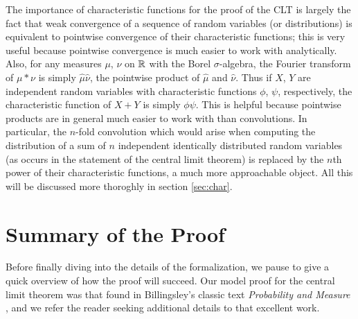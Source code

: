 \documentclass[leqno]{article}
\theoremstyle{definition}
\begin{document}
The importance of characteristic functions for the proof of the CLT is largely the fact that weak convergence of a sequence of random variables (or distributions) is equivalent to pointwise convergence of their characteristic functions; this is very useful because pointwise convergence is much easier to work with analytically. Also, for any measures $\mu$, $\nu$ on $\mathbb{R}$ with the Borel $\sigma$-algebra, the Fourier transform of $\mu * \nu$ is simply $\hat \mu \hat \nu$, the pointwise product of $\hat \mu$ and $\hat \nu$. Thus if $X$, $Y$ are independent random variables with characteristic functions $\phi$, $\psi$, respectively, the characteristic function of $X + Y$ is simply $\phi\psi$. This is helpful because pointwise products are in general much easier to work with than convolutions. In particular, the $n$-fold convolution which would arise when computing the distribution of a sum of $n$ independent identically distributed random variables (as occurs in the statement of the central limit theorem) is replaced by the $n$th power of their characteristic functions, a much more approachable object. All this will be discussed more thoroghly in section \ref{sec:char}.

\section{Summary of the Proof} \label{sec:summary}

Before finally diving into the details of the formalization, we pause to give a quick overview of how the proof will succeed. Our model proof for the central limit theorem was that found in Billingsley's classic text {\em Probability and Measure} \cite{billingsley}, and we refer the reader seeking additional details to that excellent work.
\end{document}
